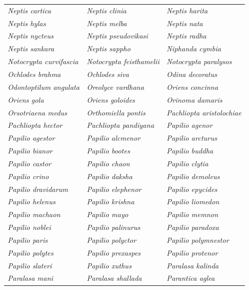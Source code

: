 \documentclass[runningheads]{llncs}
\begin{document}
\begin{longtable}{lll}
\textit{Neptis cartica} & \textit{Neptis clinia} & \textit{Neptis harita} \\
\textit{Neptis hylas} & \textit{Neptis melba} & \textit{Neptis nata} \\
\textit{Neptis nycteus} & \textit{Neptis pseudovikasi} & \textit{Neptis radha} \\
\textit{Neptis sankara} & \textit{Neptis sappho} & \textit{Niphanda cymbia} \\
\textit{Notocrypta curvifascia} & \textit{Notocrypta feisthamelii} & \textit{Notocrypta paralysos} \\
\textit{Ochlodes brahma} & \textit{Ochlodes siva} & \textit{Odina decoratus} \\
\textit{Odontoptilum angulata} & \textit{Oreolyce vardhana} & \textit{Oriens concinna} \\
\textit{Oriens gola} & \textit{Oriens goloides} & \textit{Orinoma damaris} \\
\textit{Orsotriaena medus} & \textit{Orthomiella pontis} & \textit{Pachliopta aristolochiae} \\
\textit{Pachliopta hector} & \textit{Pachliopta pandiyana} & \textit{Papilio agenor} \\
\textit{Papilio agestor} & \textit{Papilio alcmenor} & \textit{Papilio arcturus} \\
\textit{Papilio bianor} & \textit{Papilio bootes} & \textit{Papilio buddha} \\
\textit{Papilio castor} & \textit{Papilio chaon} & \textit{Papilio clytia} \\
\textit{Papilio crino} & \textit{Papilio daksha} & \textit{Papilio demoleus} \\
\textit{Papilio dravidarum} & \textit{Papilio elephenor} & \textit{Papilio epycides} \\
\textit{Papilio helenus} & \textit{Papilio krishna} & \textit{Papilio liomedon} \\
\textit{Papilio machaon} & \textit{Papilio mayo} & \textit{Papilio memnon} \\
\textit{Papilio noblei} & \textit{Papilio palinurus} & \textit{Papilio paradoxa} \\
\textit{Papilio paris} & \textit{Papilio polyctor} & \textit{Papilio polymnestor} \\
\textit{Papilio polytes} & \textit{Papilio prexaspes} & \textit{Papilio protenor} \\
\textit{Papilio slateri} & \textit{Papilio xuthus} & \textit{Paralasa kalinda} \\
\textit{Paralasa mani} & \textit{Paralasa shallada} & \textit{Parantica aglea} \\

\end{longtable}
\end{document}

